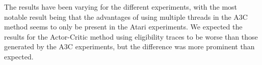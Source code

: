 \documentclass[11pt]{article}
\begin{document}
The results have been varying for the different experiments, with
the most notable result being that the advantages of using multiple threads in the A3C method
seems to only be present in the Atari experiments.
We expected the results for the Actor-Critic method using eligibility traces
to be worse than those generated by the A3C experiments, 
but the difference was more prominent than expected.
\end{document}

